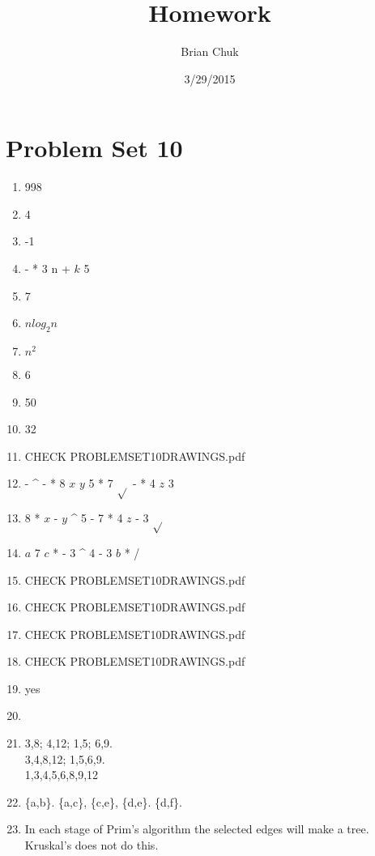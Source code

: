\documentclass[11pt]{article}
\title{\textbf{Homework}}
\author{Brian Chuk}
\date{3/29/2015}
\begin{document}
\maketitle

\section{Problem Set 10}
\begin{enumerate}
\item 998
\item 4
\item -1
\item - * 3 n + $k$ 5
\item 7
\item $nlog_2n$
\item $n^2$
\item 6
\item 50
\item 32
\item CHECK PROBLEMSET10DRAWINGS.pdf
\item - \^{} - * 8 $x$ $y$ 5 * 7 $\sqrt{}$ - * 4 $z$ 3 
\item 8 * $x$ - $y$ \^{} 5 - 7 * 4 $z$ - 3 $\sqrt{}$
\item $a$ 7 $c$ * - 3 \^{} 4 - 3 $b$ * /
\item CHECK PROBLEMSET10DRAWINGS.pdf
\item CHECK PROBLEMSET10DRAWINGS.pdf
\item CHECK PROBLEMSET10DRAWINGS.pdf
\item CHECK PROBLEMSET10DRAWINGS.pdf
\item yes
\item 
\item 3,8; 4,12; 1,5; 6,9. \\
3,4,8,12; 1,5,6,9. \\
1,3,4,5,6,8,9,12
\item \{a,b\}. \{a,c\}, \{c,e\}, \{d,e\}. \{d,f\}.
\item In each stage of Prim's algorithm the selected edges will make a tree. Kruskal's does not do this.
\end{enumerate}
\end{document}
